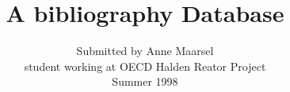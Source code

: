 \documentclass{article}
\begin{document}
\title{A bibliography Database}
\author{Submitted by Anne Maarsel\\ student working at OECD Halden
Reator Project\\ Summer 1998}
\maketitle

\begin{vdm}

\end{vdm}

\printindex
\end{document}
